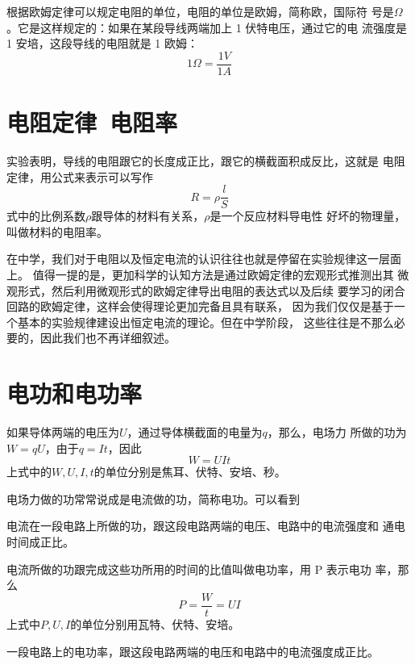 根据欧姆定律可以规定电阻的单位，电阻的单位是欧姆，简称欧，国际符
号是$\Omega$。它是这样规定的：如果在某段导线两端加上 1 伏特电压，通过它的电
流强度是 1 安培，这段导线的电阻就是 1 欧姆：
\begin{equation}
    1\Omega=\frac{1V}{1A}
\end{equation}
\section{电阻定律~电阻率}
\begin{theorem}
    实验表明，导线的电阻跟它的长度成正比，跟它的横截面积成反比，这就是 
    电阻定律，用公式来表示可以写作 
    \begin{equation}
        R=\rho\frac{l}{S}
    \end{equation}
    式中的比例系数$\rho$跟导体的材料有关系，$\rho$是一个反应材料导电性
    好坏的物理量，叫做材料的电阻率。
\end{theorem}

在中学，我们对于电阻以及恒定电流的认识往往也就是停留在实验规律这一层面上。
值得一提的是，更加科学的认知方法是通过欧姆定律的宏观形式推测出其
微观形式，然后利用微观形式的欧姆定律导出电阻的表达式以及后续
要学习的闭合回路的欧姆定律，这样会使得理论更加完备且具有联系，
因为我们仅仅是基于一个基本的实验规律建设出恒定电流的理论。但在中学阶段，
这些往往是不那么必要的，因此我们也不再详细叙述。
\section{电功和电功率}
\begin{theorem}
    如果导体两端的电压为$U$，通过导体横截面的电量为$q$，那么，电场力
    所做的功为$W=qU$，由于$q=It$，因此 
    \begin{equation}
        W=UIt
    \end{equation}
    上式中的$W,U,I,t$的单位分别是焦耳、伏特、安培、秒。
\end{theorem}

电场力做的功常常说成是电流做的功，简称电功。可以看到 
\begin{theorem}
    电流在一段电路上所做的功，跟这段电路两端的电压、电路中的电流强度和
    通电时间成正比。
\end{theorem}

\begin{definition}
    电流所做的功跟完成这些功所用的时间的比值叫做电功率，用 P 表示电功
    率，那么
    \begin{equation}
        P=\frac{W}{t}=UI
    \end{equation}
    上式中$P,U,I$的单位分别用瓦特、伏特、安培。
\end{definition}
\begin{theorem}
    一段电路上的电功率，跟这段电路两端的电压和电路中的电流强度成正比。
\end{theorem}
